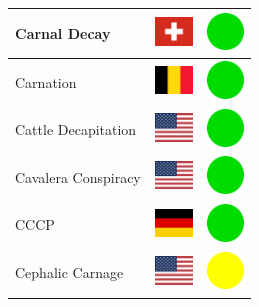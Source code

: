 \documentclass[12pt, a4paper, twoside]{report}
\begin{document}
\begin{center}
\begin{longtable}{|p{5cm}|p{2cm}|p{2cm}|}
Carnal Decay & \includegraphics[width=1cm]{4x3/ch} & \includegraphics[width=1cm]{likes/y} \\ \hline
Carnation & \includegraphics[width=1cm]{4x3/be} & \includegraphics[width=1cm]{likes/y} \\ \hline
Cattle Decapitation & \includegraphics[width=1cm]{4x3/us} & \includegraphics[width=1cm]{likes/y} \\ \hline
Cavalera Conspiracy & \includegraphics[width=1cm]{4x3/us} & \includegraphics[width=1cm]{likes/y} \\ \hline
CCCP & \includegraphics[width=1cm]{4x3/de} & \includegraphics[width=1cm]{likes/y} \\ \hline
Cephalic Carnage & \includegraphics[width=1cm]{4x3/us} & \includegraphics[width=1cm]{likes/m} \\ \hline

\end{longtable}
\end{center}
\end{document}
